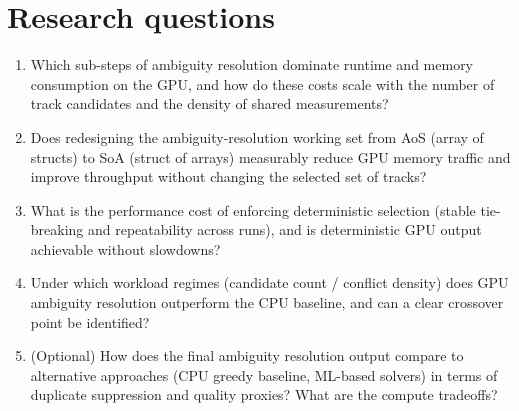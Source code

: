 \section{Research questions}

\begin{enumerate}[label=\textbf{RQ\arabic*:}]
  \item Which sub-steps of ambiguity resolution dominate runtime and memory consumption on the GPU, and how do these costs scale with the number of track candidates and the density of shared measurements?
  \item Does redesigning the ambiguity-resolution working set from AoS (array of structs) to SoA (struct of arrays) measurably reduce GPU memory traffic and improve throughput without changing the selected set of tracks?
  \item What is the performance cost of enforcing deterministic selection (stable tie-breaking and repeatability across runs), and is deterministic GPU output achievable without slowdowns?
  \item Under which workload regimes (candidate count / conflict density) does GPU ambiguity resolution outperform the CPU baseline, and can a clear crossover point be identified?
  \item (Optional) How does the final ambiguity resolution output compare to alternative approaches (CPU greedy baseline, ML-based solvers) in terms of duplicate suppression and quality proxies? What are the compute tradeoffs?
\end{enumerate}
